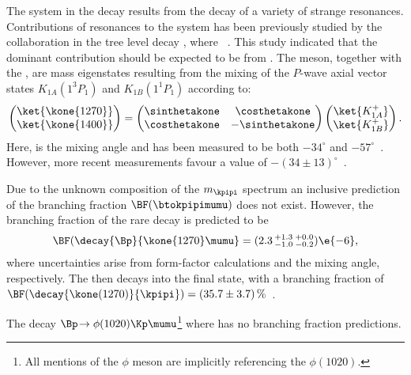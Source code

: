 The \kpipi system in the decay \btokpipimumu results from the decay of a variety of strange
resonances.
Contributions of resonances to the \kpipi system has been previously studied by the \belle collaboration
in the tree level decay \btojpsikpipi, where \jpsitomumu~\cite{Guler:2010if}.
This study indicated that the dominant contribution should be expected
to be from .
The  meson, together with the , are mass eigenstates resulting from the
mixing of the $P$-wave axial vector states $K_{1A}(1^3P_1)$ and $K_{1B}(1^1P_1)$ according to:
\begin{equation}
  \begin{pmatrix}
    \ket{\kone{1270}} \\
    \ket{\kone{1400}}
  \end{pmatrix}
  =
  \begin{pmatrix}
    \sinthetakone & \costhetakone \\
    \costhetakone & -\sinthetakone
  \end{pmatrix}
  \begin{pmatrix}
    \ket{K_{1A}^+} \\
    \ket{K_{1B}^+}
  \end{pmatrix}.
  \label{eq:k1mixing}
\end{equation}
Here, \thetakone is the mixing angle and has been measured to be both $-34^\circ$ and
$-57^\circ$~\cite{PhysRevD.47.1252,Tayduganov:2011ui,Hatanaka:2008xj,Cheng:2011pb,Divotgey:2013jba,Cheng:2013cwa}.
However, more recent measurements favour a value of
$-(34\pm13)^\circ$~\cite{Hatanaka:2008xj,Cheng:2011pb,Divotgey:2013jba,Cheng:2013cwa}.

Due to the unknown composition of the $m_\kpipi$ spectrum an inclusive prediction of the branching
fraction $\BF(\btokpipimumu)$ does not exist.
However, the branching fraction of the rare decay  is predicted to
be~\cite{Hatanaka:2008gu}
\begin{equation}
  \BF(\decay{\Bp}{\kone{1270}\mumu} = (2.3\,^{+1.3}_{-1.0}\,^{+0.0}_{-0.2})\e{-6},
\end{equation}
where uncertainties arise from form-factor calculations and the mixing angle, respectively.
The  then decays into the \kpipi final state, with a branching fraction of
$\BF(\decay{\kone(1270)}{\kpipi})=(35.7\pm3.7)\,\%$~\cite{PDG2012}.

The decay $\Bp\!\to\phi(1020)\Kp\mumu$\footnote{All mentions of the $\phi$ meson are implicitly
  referencing the $\phi(1020)$.
} where \decay{\phi}{\kk} has no branching fraction predictions.





